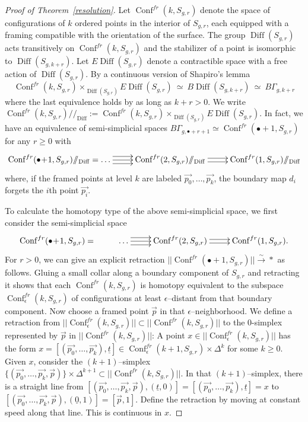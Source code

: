\documentclass[10pt]{amsart}
\newcommand{\Ga}{\Gamma}
\newcommand{\De}{\Delta}
\newcommand{\rar}{\longrightarrow}
\newcommand{\sta}{\stackrel}
\newcommand{\x}{\times}
\newcommand{\Dif}{\operatorname{Diff}}
\newcommand{\Conf}{\operatorname{Conf}^{fr}}
\begin{document}
\begin{proof}[Proof of Theorem~\ref{resolution}]
Let $\Conf(k,S_{g,r})$ denote the space of configurations of $k$ ordered points in the interior of $S_{g,r}$, each equipped with a framing 
compatible with the orientation of the surface.  
The group $\Dif(S_{g,r})$ acts transitively on $\Conf(k,S_{g,r})$ and the stabilizer of a point is isomorphic to
$\Dif(S_{g,k+r})$. Let $E\Dif(S_{g,r})$ denote a contractible space with a free action of $\Dif(S_{g,r})$. 
By a continuous version of Shapiro's lemma 
$$\Conf(k,S_{g,r})\times_{\Dif(S_{g,r})}E\Dif(S_{g,r})\ \simeq\ B\Dif(S_{g,k+r})\ \simeq\  B\Ga_{g,k+r}$$
where the last equivalence holds by \cite{EE,ES} as long as $k+r>0$. 
We write $\Conf(k,S_{g,r})/\!\!/_{\Dif}:=\Conf(k,S_{g,r})\times_{\Dif(S_{g,r})}E\Dif(S_{g,r})$. In fact, we have an equivalence of 
semi-simplicial spaces $B\Ga_{g,\bullet+r+1}\simeq \Conf(\bullet\!+\!1,S_{g,r})$ for any $r\ge 0$ with  
$$\xymatrix{\Conf(\bullet\!+\!1,S_{g,r})/\!\!/_{\Dif}= \dots\ar[r] \ar@<1ex>[r] \ar@<-1ex>[r]
& \Conf(2,S_{g,r})/\!\!/_{\Dif}\ar@<.5ex>[r] \ar@<-.5ex>[r]& \Conf(1,S_{g,r})/\!\!/_{\Dif}}$$
where, if the framed points at level $k$ are labeled $\overrightarrow{p_0},\dots,\overrightarrow{p_k}$, 
the boundary map $d_i$ forgets the $i$th point
$\overrightarrow{p_i}$.  

To calculate the homotopy type of the above semi-simplicial space, we first consider the semi-simplicial space
$$\xymatrix{\Conf(\bullet\!+\!1,S_{g,r})=&\dots\ar[r] \ar@<1ex>[r] \ar@<-1ex>[r]&\Conf(2,S_{g,r})\ar@<.5ex>[r] \ar@<-.5ex>[r]& \Conf(1,S_{g,r}).}$$
For $r>0$, we can give an explicit retraction $||\Conf(\bullet+1,S_{g,r})||\sta{\sim}{\rar} *$ as follows. 
Gluing a small collar along a boundary
component of $S_{g,r}$ and retracting it shows that each $\Conf(k,S_{g,r})$ is homotopy equivalent to the subspace 
$\Conf_\epsilon(k,S_{g,r})$ of configurations
at least $\epsilon$--distant from that boundary component. Now choose a framed point $\overrightarrow{p}$ in that $\epsilon$--neighborhood. 
We define a retraction from $||\Conf_\epsilon(k,S_{g,r})||\subset ||\Conf(k,S_{g,r})||$ to the 0-simplex represented by
$\overrightarrow{p}$ in $||\Conf(k,S_{g,r})||$: 
A point $x\in ||\Conf_\epsilon(k,S_{g,r})||$ has the form 
$x=[(\overrightarrow{p_0},\dots,\overrightarrow{p_k}),\underline{t}]\in \Conf_\epsilon(k+1,S_{g,r})\x \De^{k}$ for some $k\ge 0$. 
Given $x$, consider the $(k+1)$--simplex  $\{(\overrightarrow{p_0},\dots,\overrightarrow{p_k},\overrightarrow{p})\}\x \De^{k+1}\subset
||\Conf(k,S_{g,r})||$.  In that $(k+1)$--simplex, there is a straight
line from
$[(\overrightarrow{p_0},\dots,\overrightarrow{p_k},\overrightarrow{p}),(\underline{t},0)]
=[(\overrightarrow{p_0},\dots,\overrightarrow{p_k}),\underline{t}]=x$ to
$[(\overrightarrow{p_0},\dots,\overrightarrow{p_k},\overrightarrow{p}),(\underline{0},1)]=[\overrightarrow{p},1]$. Define the
retraction by moving 
at constant speed along that line. This is continuous in $x$. 


\end{proof}
\end{document}
